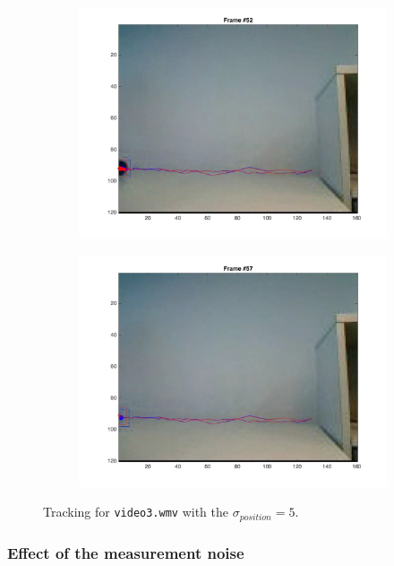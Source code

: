 \documentclass{ethz_report}
\begin{document}
\begin{figure}[h]
\begin{subfigure}[b]{.25\textwidth}
        \includegraphics[width=1\linewidth]{images/video3_noise_low_51}
    \end{subfigure}%
    \begin{subfigure}[b]{.25\textwidth}
        \centering
        \includegraphics[width=1\linewidth]{images/video3_noise_low_56}
    \end{subfigure}
    \caption{Tracking for \texttt{video3.wmv} with the $\sigma_{position} = 5$.}
    \label{fig:tracking_video3_noise_low}
\end{figure}

\subsubsection*{Effect of the measurement noise}
\end{document}
